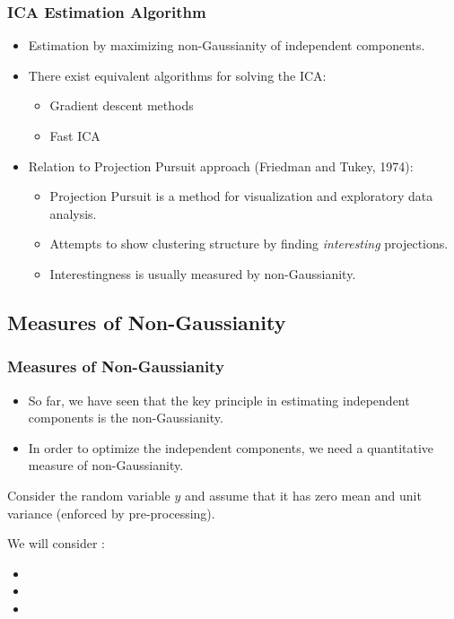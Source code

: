 \begin{frame}
  \frametitle{ICA Estimation Algorithm \cont}


  \begin{itemize}
    \item Estimation by maximizing non-Gaussianity of independent components. \pause
    \item There exist equivalent algorithms for solving the ICA:
      \begin{itemize}
        \item Gradient descent methods
        \item Fast ICA
      \end{itemize}
      \pause
    \item Relation to Projection Pursuit approach (Friedman and Tukey, 1974):
      \begin{itemize}
        \item Projection Pursuit is a method for visualization and exploratory data analysis.
        \item Attempts to show clustering structure by finding \textit{interesting} projections.
        \item Interestingness is usually measured by non-Gaussianity.
      \end{itemize}
  \end{itemize}
\end{frame}



\subsection{Measures of Non-Gaussianity}

\begin{frame}
  \frametitle{Measures of Non-Gaussianity}

  \begin{itemize}
    \item So far, we have seen that the key principle in estimating independent components is the non-Gaussianity. \pause
    \item In order to optimize the independent components, we need a quantitative measure of non-Gaussianity.
  \end{itemize}
  \pspread

  Consider the random variable $y$ and assume that it has zero mean and unit variance (enforced by pre-processing).\\[.5cm] \pause

  We will consider :

  \begin{itemize}
    \item {}
    \item {}
    \item {}
  \end{itemize}
\end{frame}


